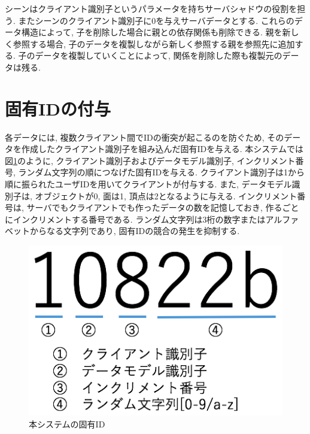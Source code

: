 シーンはクライアント識別子というパラメータを持ちサーバシャドウの役割を担う.
またシーンのクライアント識別子に0を与えサーバデータとする.
これらのデータ構造によって, 子を削除した場合に親との依存関係も削除できる.
親を新しく参照する場合, 子のデータを複製しながら新しく参照する親を参照先に追加する.
子のデータを複製していくことによって, 関係を削除した際も複製元のデータは残る.
\section{固有IDの付与} \label{固有id}
各データには, 複数クライアント間でIDの衝突が起こるのを防ぐため, そのデータを作成したクライアント識別子を組み込んだ固有IDを与える.
本システムでは図\ref{uuid}のように, クライアント識別子およびデータモデル識別子, インクリメント番号, ランダム文字列の順につなげた固有IDを与える. クライアント識別子は1から順に振られたユーザIDを用いてクライアントが付与する. また, データモデル識別子は, オブジェクトが0, 面は1, 頂点は2となるように与える.
インクリメント番号は, サーバでもクライアントでも作ったデータの数を記憶しておき, 作るごとにインクリメントする番号である. ランダム文字列は3桁の数字またはアルファベットからなる文字列であり, 固有IDの競合の発生を抑制する.
\begin{figure}[]
  \begin{center}
    \includegraphics[scale=0.5]{images/uuid}
    \caption{本システムの固有ID}
    \label{uuid}
  \end{center}
\end{figure}

